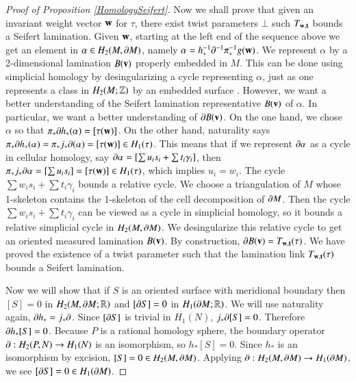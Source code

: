 \documentclass[12pt]{article}
\theoremstyle{remark}
\begin{document}
\begin{proof}[Proof of Proposition \ref{HomologySeifert}]
Now we shall prove that given an invariant weight vector ${\bf w}$ for $\tau$, there exist twist parameters $\bot$ such $T_{{\bf w},{\bf t}}$ bounds a Seifert lamination.   Given ${\bf w}$, starting at the left end of the sequence above we get an element in $\alpha\in H_2(M,\partial M)$, namely $\alpha=h_*^{-1}\partial^{-1}\pi_*^{-1} g({\bf w})$.  We represent $\alpha$ by a 2-dimensional lamination $B({\bf v})$ properly embedded in $M$.   This can be done using simplicial homology by desingularizing a cycle representing $\alpha$, just as one represents a class in $H_2(M;\mathbb Z)$ by an embedded surface .   However, we want a better understanding of the Seifert lamination representative $B({\bf v})$ of $\alpha$.  In particular, we want a better understanding of $\partial B({\bf v})$.   On the one hand, we chose $\alpha$ so that $\pi_*\partial h_*(\alpha)= [\tau({\bf w})]$.   On the other hand, naturality says  $\pi_*\partial h_*(\alpha)= \pi_*j_*\partial(\alpha)=[\tau({\bf w})]\in H_1(\tau)$.     This means that if we represent $\partial \alpha$ as a cycle in cellular homology, say $\partial \alpha =[\sum u_is_i +\sum  t_i\gamma_i]$, then $\pi_*j_*\partial\alpha=[\sum u_is_i]=[\tau({\bf w})]\in H_1(\tau)$, which implies $u_i=w_i$.  The cycle $\sum w_is_i +\sum  t_i\gamma_i$ bounds a relative cycle.   We choose a triangulation of $M$ whose 1-skeleton contains the 1-skeleton of the cell decomposition of $\partial M$.    Then the cycle  $\sum w_is_i +\sum  t_i\gamma_i$ can be viewed as a cycle in simplicial homology, so it bounds a relative simplicial cycle in $H_2(M,\partial M)$.   We desingularize this relative cycle to get an oriented measured lamination $B({\bf v})$.  By construction, $\partial B({\bf v})=T_{{\bf w},{\bf t}}(\tau)$.  We have proved the existence of a twist parameter such that the lamination link $T_{{\bf w},{\bf t}}(\tau)$ bounds a Seifert lamination.

Now we will show that if $S$ is an oriented surface with meridional boundary then $[S]=0$ in $H_2(M,\partial M;\mathbb R)$ and $[\partial S]=0$ in $H_1(\partial M;\mathbb R)$.  We will use naturality again, $\partial h_*=j_*\partial$.   Since $[\partial S]$ is trivial in $H_1(N)$, $j_*\partial [S]=0$.   Therefore $\partial h_*[S]=0$.  Because $P$ is a rational homology sphere, the boundary operator $\partial:H_2(P,N)\to H_1(N)$ is an isomorphism, so $h_*[S]=0$.   Since $h_*$ is an isomorphism by excision, $[S]=0\in H_2(M,\partial M)$.  Applying $\partial:H_2(M,\partial M)\to H_1(\partial M)$, we see $[\partial S]=0\in H_1(\partial M)$.
\end{proof}
\end{document}
